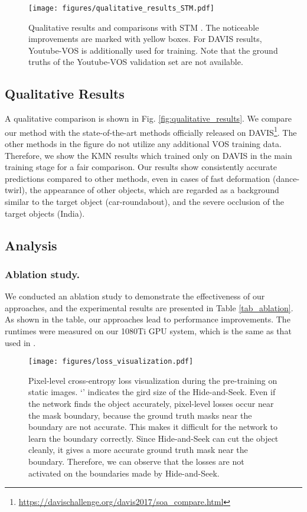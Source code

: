 \documentclass[runningheads]{llncs}
\begin{document}
\begin{figure}
\centering
\texttt{[image: figures/qualitative\_results\_STM.pdf]}
\caption{
Qualitative results and comparisons with STM \cite{Oh_2019_ICCV}. The noticeable improvements are marked with yellow boxes. For DAVIS results, Youtube-VOS is additionally used for training. Note that the ground truths of the Youtube-VOS validation set are not available.
}
\label{fig:qualitative_results_STM}
\end{figure}

\subsection{Qualitative Results}
\label{s45}
A qualitative comparison is shown in Fig. \ref{fig:qualitative_results}. We compare our method with the state-of-the-art methods officially released on DAVIS\footnote{\url{https://davischallenge.org/davis2017/soa\_compare.html}}. The other methods in the figure do not utilize any additional VOS training data. Therefore, we show the KMN results which trained only on DAVIS in the main training stage for a fair comparison. Our results show consistently accurate predictions compared to other methods, even in cases of fast deformation (dance-twirl), the appearance of other objects, which are regarded as a background similar to the target object (car-roundabout), and the severe occlusion of the target objects (India).





\subsection{Analysis}
\label{s46}
\subsubsection{Ablation study.}
We conducted an ablation study to demonstrate the effectiveness of our approaches, and the experimental results are presented in Table \ref{tab_ablation}. As shown in the table, our approaches lead to performance improvements. The runtimes were measured on our 1080Ti GPU system, which is the same as that used in \cite{Oh_2019_ICCV}.


\begin{figure}[t]
\centering
\texttt{[image: figures/loss\_visualization.pdf]}
\caption{
Pixel-level cross-entropy loss visualization during the pre-training on static images. `' indicates the gird size of the Hide-and-Seek. Even if the network finds the object accurately, pixel-level losses occur near the mask boundary, because the ground truth masks near the boundary are not accurate. This makes it difficult for the network to learn the boundary correctly. Since  Hide-and-Seek can cut the object cleanly, it gives a more accurate ground truth mask near the boundary. Therefore, we can observe that the losses are not activated on the boundaries made by Hide-and-Seek.
}
\label{fig:loss_visualization}
\end{figure}
\end{document}
